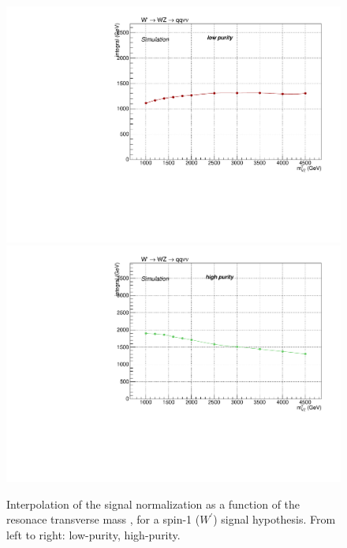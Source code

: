 \begin{figure}[!htb]
  \centering
    \includegraphics[width=.495\textwidth]{plotsAlpha_tesi/XVZnnlp/XWZInv_SignalNorm.pdf}
    \includegraphics[width=.495\textwidth]{plotsAlpha_tesi/XVZnnhp/XWZInv_SignalNorm.pdf}
  \caption{Interpolation of the signal normalization as a function of the resonace transverse mass \mtVZ, for a spin-1 ($W^{'}$) signal hypothesis. From left to right: low-purity, high-purity.}
  \label{fig:XWZ_SignalNorm}
\end{figure}


\clearpage


